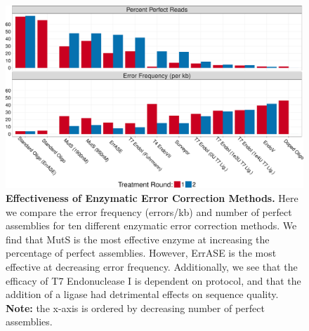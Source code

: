 \documentclass[letterpaper,12pt]{article}
\begin{document}

\clearpage
\begin{figure}[t]
\centering
\includegraphics[width=174mm]{Figure_3-1.pdf}
\caption{\small \textbf{Effectiveness of Enzymatic Error Correction Methods.} Here we compare the error frequency (errors/kb) and number of perfect assemblies for ten different enzymatic error correction methods. We find that MutS is the most effective enzyme at increasing the percentage of perfect assemblies. However, ErrASE is the most effective at decreasing error frequency. Additionally, we see that the efficacy of T7 Endonuclease I is dependent on protocol, and that the addition of a ligase had detrimental effects on sequence quality. \textbf{Note:} the x-axis is ordered by decreasing number of perfect assemblies.}
\label{fig:errorRates}
\end{figure}

\end{document}
